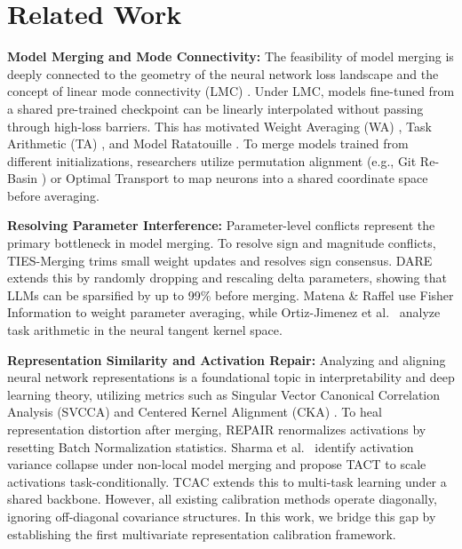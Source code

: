 \documentclass{article}
\theoremstyle{plain}
\theoremstyle{definition}
\theoremstyle{remark}
\begin{document}
\section{Related Work}
\label{sec:related}

\textbf{Model Merging and Mode Connectivity:} The feasibility of model merging is deeply connected to the geometry of the neural network loss landscape and the concept of linear mode connectivity (LMC) \cite{mode_connectivity_garipov, mode_connectivity_draxler}. Under LMC, models fine-tuned from a shared pre-trained checkpoint can be linearly interpolated without passing through high-loss barriers. This has motivated Weight Averaging (WA) \cite{soups}, Task Arithmetic (TA) \cite{task_arithmetic}, and Model Ratatouille \cite{model_ratatouille}. To merge models trained from different initializations, researchers utilize permutation alignment (e.g., Git Re-Basin \cite{git_rebasin, model_recombination_entezari}) or Optimal Transport \cite{ot_alignment_singh} to map neurons into a shared coordinate space before averaging.

\textbf{Resolving Parameter Interference:} Parameter-level conflicts represent the primary bottleneck in model merging. To resolve sign and magnitude conflicts, TIES-Merging \cite{ties_merging} trims small weight updates and resolves sign consensus. DARE \cite{dare} extends this by randomly dropping and rescaling delta parameters, showing that LLMs can be sparsified by up to 99\% before merging. Matena \& Raffel \cite{fisher_merging} use Fisher Information to weight parameter averaging, while Ortiz-Jimenez et al.\ \cite{model_arithmetic_ortiz} analyze task arithmetic in the neural tangent kernel space.

\textbf{Representation Similarity and Activation Repair:} Analyzing and aligning neural network representations is a foundational topic in interpretability and deep learning theory, utilizing metrics such as Singular Vector Canonical Correlation Analysis (SVCCA) \cite{robust_representation_raghu} and Centered Kernel Alignment (CKA) \cite{cka_representation, robust_representation_kornblith}. To heal representation distortion after merging, REPAIR \cite{repair} renormalizes activations by resetting Batch Normalization \cite{batchnorm} statistics. Sharma et al.\ \cite{tact} identify activation variance collapse under non-local model merging and propose TACT to scale activations task-conditionally. TCAC extends this to multi-task learning under a shared backbone. However, all existing calibration methods operate diagonally, ignoring off-diagonal covariance structures. In this work, we bridge this gap by establishing the first multivariate representation calibration framework.
\end{document}
